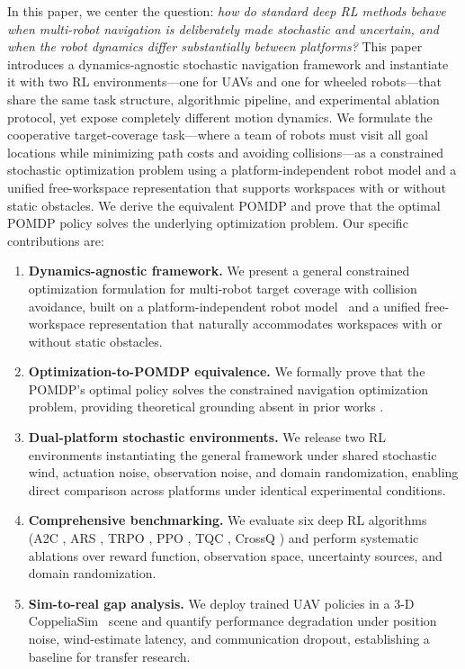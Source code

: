 \documentclass{article}
\begin{document}
In this paper, we center the question: \emph{how do standard deep RL methods behave when multi-robot navigation is deliberately made stochastic and uncertain, and when the robot dynamics differ substantially between platforms?} This paper introduces a dynamics-agnostic stochastic navigation framework and instantiate it with two RL environments---one for UAVs and one for wheeled robots---that share the same task structure, algorithmic pipeline, and experimental ablation protocol, yet expose completely different motion dynamics. We formulate the cooperative target-coverage task---where a team of robots must visit all goal locations while minimizing path costs and avoiding collisions---as a constrained stochastic optimization problem using a platform-independent robot model and a unified free-workspace representation that supports workspaces with or without static obstacles. We derive the equivalent POMDP and
prove that the optimal POMDP policy solves the underlying optimization problem. Our specific contributions are:
\begin{enumerate}
\item \textbf{Dynamics-agnostic framework.} We present a general constrained optimization formulation for multi-robot target coverage with collision avoidance, built on a platform-independent robot model~\citep{le2021icra} and a unified free-workspace representation that naturally accommodates workspaces with or without static obstacles.

\item \textbf{Optimization-to-POMDP equivalence.} We formally prove that the POMDP's optimal policy solves the constrained navigation optimization problem, providing theoretical grounding absent in prior works \citep{chen2017icra, everett2018iros, fan2020ijrr}.

\item \textbf{Dual-platform stochastic environments.} We release two RL environments instantiating the general framework under shared stochastic wind, actuation noise, observation noise, and domain randomization, enabling direct comparison across platforms under identical experimental conditions.

\item \textbf{Comprehensive benchmarking.} We evaluate six deep RL algorithms (A2C \citep{mnih2016a2c}, ARS \citep{mania2018ars}, TRPO \citep{schulman2015trust}, PPO
\citep{schulman2017ppo}, TQC \citep{kuznetsov2020tqc}, CrossQ \citep{bhatt2024crossq}) and perform systematic ablations over reward function, observation space, uncertainty sources, and domain randomization.

\item \textbf{Sim-to-real gap analysis.} We deploy trained UAV policies in a 3-D CoppeliaSim~\citep{coppeliaSim2013} scene and quantify performance degradation under position noise, wind-estimate latency, and communication dropout, establishing a baseline for transfer research.
\end{enumerate}
\end{document}
